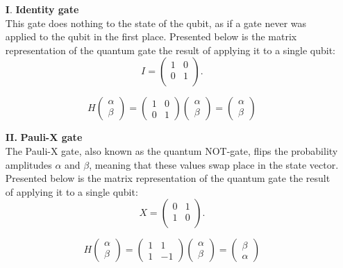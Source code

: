 \documentclass[onecolumn,10pt,cleanfoot]{asme2ej}
\begin{document}
\begin{enumerate}
	\item[\textbf{I}.] \textbf{Identity gate} \\
		This gate does nothing to the state of the qubit, as if a gate never was applied to the qubit in the first place. Presented below is the matrix representation of the quantum gate the result of applying it to a single qubit:
		\begin{equation*}
			I = \begin{pmatrix}
			1 & 0 \\
			0 & 1 \\
		\end{pmatrix}.
		\end{equation*}


		\begin{equation*}
		H \begin{pmatrix}
		\alpha \\
		\beta
		\end{pmatrix}
		=
		\begin{pmatrix}
		1 & 0 \\
		0 & 1
		\end{pmatrix}
		\begin{pmatrix}
		\alpha \\
		\beta
		\end{pmatrix}
		=
		\begin{pmatrix}
		\alpha \\
		\beta
		\end{pmatrix}
		\end{equation*}


	\item[\textbf{II.}] \textbf{Pauli-X gate} \\
		The Pauli-X gate, also known as the quantum NOT-gate, flips the probability amplitudes $\alpha$ and $\beta$, meaning that these values swap place in the state vector. Presented below is the matrix representation of the quantum gate the result of applying it to a single qubit:
		\begin{equation*}
			X = \begin{pmatrix}
			0 & 1 \\
			1 & 0 \\
		\end{pmatrix}.
	\end{equation*}

	\begin{equation*}
		H \begin{pmatrix}
		\alpha \\
		\beta
		\end{pmatrix}
		=
		\begin{pmatrix}
		1 & 1 \\
		1 & -1
		\end{pmatrix}
		\begin{pmatrix}
		\alpha \\
		\beta
		\end{pmatrix}
		=
		\begin{pmatrix}
		\beta \\
		\alpha
		\end{pmatrix}
	\end{equation*}


\end{enumerate}
\end{document}
